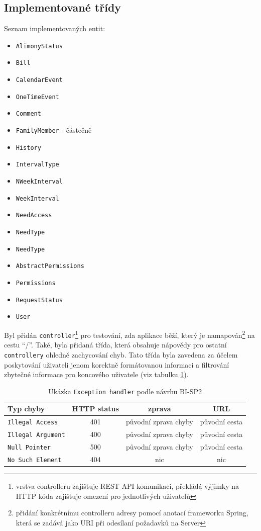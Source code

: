     \subsection{Implementované třídy}
        Seznam implementovaných entit:
        \begin{itemize}
            \item \texttt{AlimonyStatus}
            \item \texttt{Bill}
            \item \texttt{CalendarEvent}
            \item \texttt{OneTimeEvent}
            \item \texttt{Comment}
            \item \texttt{FamilyMember} - částečně
            \item \texttt{History}
            \item \texttt{IntervalType}
            \item \texttt{NWeekInterval}
            \item \texttt{WeekInterval}
            \item \texttt{NeedAccess}
            \item \texttt{NeedType}
            \item \texttt{NeedType}
            \item \texttt{AbstractPermissions}
            \item \texttt{Permissions}
            \item \texttt{RequestStatus}
            \item \texttt{User}
        \end{itemize}
        
        Byl přidán \texttt{controller}\footnote{vrstva controlleru zajišťuje REST API komunikaci, překládá výjimky na HTTP kóda zajišťuje omezení pro jednotlivých uživatelů} pro testování, zda aplikace běží, který je namapován\footnote{přidání konkrétnímu controlleru adresy pomocí anotací frameworku Spring, která se zadává jako URI při odesílaní požadavků na Server} na cestu \enquote{/}. Také, byla přidaná třída, která obsahuje nápovědy pro ostatní \texttt{controllery} ohledně zachycování chyb. Tato třída byla zavedena za účelem poskytování uživateli jenom korektně formátovanou informaci  a filtrování zbytečné informace pro koncového uživatele (viz tabulku \ref{tab:excpetion-handler1}). 
        \begin{table}\centering
	    \caption[Exception handler]{Ukázka \texttt{Exception handler} podle návrhu BI-SP2}\label{tab:excpetion-handler1}
	    \begin{tabular}{|l|c|c|c|}\hline
		  Typ chyby		& HTTP status		& zprava	& URL	\tabularnewline \hline \hline
		  \texttt{Illegal Access}	& 401	& původní zprava chyby		& původní cesta     \tabularnewline \hline
		  \texttt{Illegal Argument}	& 400	& původní zprava chyby		& původní cesta     \tabularnewline \hline
		  \texttt{Null Pointer}	& 500	& původní zprava chyby		& původní cesta     \tabularnewline \hline
		  \texttt{No Such Element}	& 404	& nic		& nic     \tabularnewline \hline
	    \end{tabular}
        \end{table}
    
